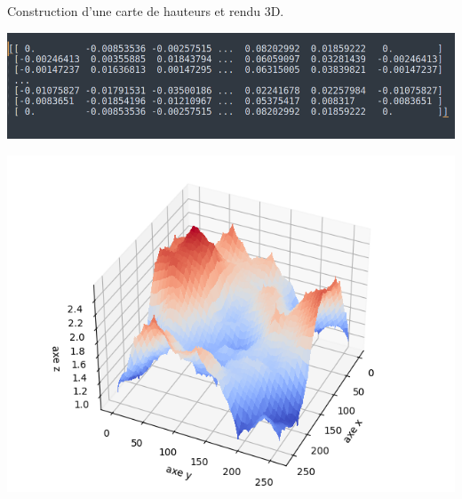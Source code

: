 \documentclass[11pt,class=report,crop=false]{standalone}
\begin{document}
\begin{exemple}
Construction d'une carte de hauteurs et rendu 3D.

\begin{center}

\begin{minipage}{0.4\textwidth}
\includegraphics[scale=\myscale,scale=0.2]{figures/hauteurs-capture-04}
\end{minipage}
\begin{minipage}{0.4\textwidth}
\includegraphics[scale=\myscale,scale=0.5]{figures/hauteurs-01}
\end{minipage}


\end{center}
\end{exemple}
\end{document}
